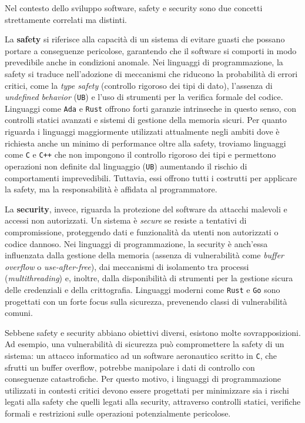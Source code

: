 Nel contesto dello sviluppo software, safety e security sono due concetti strettamente correlati ma distinti.

La \textbf{safety} si riferisce alla capacità di un sistema di evitare guasti che possano portare a conseguenze pericolose, garantendo che il software si comporti in modo prevedibile anche in condizioni anomale.
Nei linguaggi di programmazione, la safety si traduce nell’adozione di meccanismi che riducono la probabilità di errori critici, come la \textit{type safety} (controllo rigoroso dei tipi di dato), l’assenza di \textit{undefined behavior} (\texttt{UB}) e l’uso di strumenti per la verifica formale del codice. Linguaggi come \texttt{Ada} e \texttt{Rust} offrono forti garanzie intrinseche in questo senso, con controlli statici avanzati e sistemi di gestione della memoria sicuri. Per quanto riguarda i linguaggi maggiormente utilizzati attualmente negli ambiti dove è richiesta anche un minimo di performance oltre alla safety, troviamo linguaggi come \texttt{C} e \texttt{C++} che non impongono il controllo rigoroso dei tipi e permettono operazioni non definite dal linguaggio (\texttt{UB}) aumentando il rischio di comportamenti imprevedibili. Tuttavia, essi offrono tutti i costrutti per applicare la safety, ma la responsabilità è affidata al programmatore.

La \textbf{security}, invece, riguarda la protezione del software da attacchi malevoli e accessi non autorizzati. Un sistema è \textit{secure} se resiste a tentativi di compromissione, proteggendo dati e funzionalità da utenti non autorizzati o codice dannoso.
Nei linguaggi di programmazione, la security è anch'essa influenzata dalla gestione della memoria (assenza di vulnerabilità come \textit{buffer overflow} o \textit{use-after-free}), dai meccanismi di isolamento tra processi (\textit{multithreading}) e, inoltre, dalla disponibilità di strumenti per la gestione sicura delle credenziali e della crittografia. Linguaggi moderni come \texttt{Rust} e \texttt{Go} sono progettati con un forte focus sulla sicurezza, prevenendo classi di vulnerabilità comuni.

Sebbene safety e security abbiano obiettivi diversi, esistono molte sovrapposizioni.
Ad esempio, una vulnerabilità di sicurezza può compromettere la safety di un sistema: un attacco informatico ad un software aeronautico scritto in \texttt{C}, che sfrutti un buffer overflow, potrebbe manipolare i dati di controllo con conseguenze catastrofiche. Per questo motivo, i linguaggi di programmazione utilizzati in contesti critici devono essere progettati per minimizzare sia i rischi legati alla safety che quelli legati alla security, attraverso controlli statici, verifiche formali e restrizioni sulle operazioni potenzialmente pericolose.